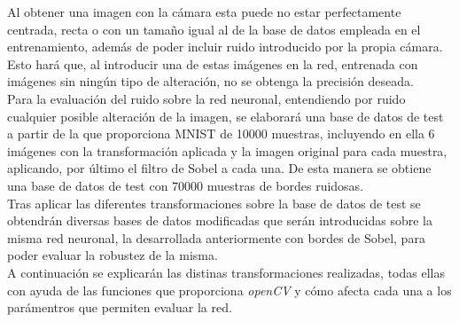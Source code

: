 Al obtener una imagen con la cámara esta puede no estar perfectamente centrada, recta o con un tamaño igual al de la base de datos empleada en el entrenamiento, además de poder incluir ruido introducido por la propia cámara. Esto hará que, al introducir una de estas imágenes en la red, entrenada con imágenes sin ningún tipo de alteración, no se obtenga la precisión deseada.\\

Para la evaluación del ruido sobre la red neuronal, entendiendo por ruido cualquier posible alteración de la imagen, se elaborará una base de datos de test a partir de la que proporciona MNIST de 10000 muestras, incluyendo en ella 6 imágenes con la transformación aplicada y la imagen original para cada muestra, aplicando, por último el filtro de Sobel a cada una. De esta manera se obtiene una base de datos de test con 70000 muestras de bordes ruidosas.\\

Tras aplicar las diferentes transformaciones sobre la base de datos de test se obtendrán diversas bases de datos modificadas que serán introducidas sobre la misma red neuronal, la desarrollada anteriormente con bordes de Sobel, para poder evaluar la robustez de la misma.\\

A continuación se explicarán las distinas transformaciones realizadas, todas ellas con ayuda de las funciones que proporciona \textit{openCV} y cómo afecta cada una a los parámentros que permiten evaluar la red.

